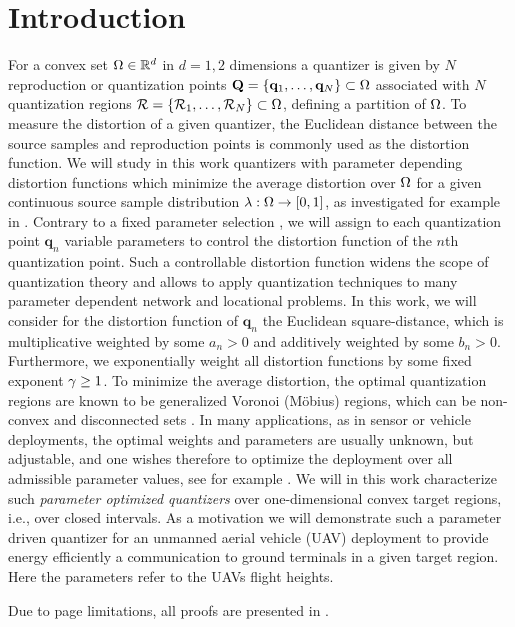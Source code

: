 \documentclass[smallabstract,smallcaptions]{dccpaper}
\newif\ifarxiv\arxivfalse
\newcounter{example}[section]
\renewcommand{\vp}{\mathbf q}
\renewcommand{\vP}{\mathbf Q}
\newcommand{\Rset}{\ensuremath{\mathcal R}}
\begin{document}
\section{Introduction}

%
For a convex set $\Omega\in{\ensuremath{\mathbb R}}^d$ in $d=1,2$ dimensions a quantizer is given by $N$ reproduction or
quantization points $\vP=\{\vp_1,\dots,\vp_N\}\subset \Ome$ associated with $N$ quantization regions
$\Rset=\{\Rset_1,\dots,\Rset_N\}\subset\Ome$, defining a partition of $\Omega$.
%
%
To measure the distortion of a given quantizer, the Euclidean distance between the source samples and reproduction
points is commonly used as the distortion function. We will study in this work quantizers with parameter depending
distortion functions which minimize the average distortion over $\Omega$ for a given continuous source sample
distribution $\lambda:\Omega\to [0,1]$, as investigated for example in \cite{Erdem16,KJ17,KKSS18}.
%
Contrary to a fixed parameter selection \cite{Erdem16}, we will assign to each quantization point $\vp_n$ variable
parameters to control the distortion function of the $n$th quantization point.
Such a controllable distortion function widens the scope of quantization theory and allows to apply quantization
techniques to many parameter dependent network and locational problems.
%
%
In this work, we will consider for the distortion function of $\vp_n$ the Euclidean square-distance, which is multiplicative weighted
by some $a_n>0$ and additively weighted by some $b_n>0$. Furthermore, we exponentially weight all distortion functions by
some fixed exponent $\gamma\geq 1$. To minimize the average distortion, the optimal quantization regions are known to be
generalized Voronoi (Möbius) regions, which can be non-convex and disconnected sets \cite{BWY07}.
%
In many applications, as in sensor or vehicle deployments, the optimal weights and parameters are usually unknown, but
adjustable, and one wishes therefore to optimize the deployment over all admissible parameter values, see for example 
 \cite{KKSS18}.
%
We will in this work characterize such \emph{parameter optimized quantizers}  over one-dimensional convex target
regions, i.e., over closed intervals. As a motivation we will demonstrate such a parameter driven quantizer for an
unmanned aerial vehicle (UAV) deployment to provide energy efficiently a communication to ground terminals in a given
target region.  Here the parameters refer to the UAVs flight heights.  
\ifarxiv
\else
Due to page limitations, all proofs are presented in \cite{GWJ18b}.
\fi
\end{document}
